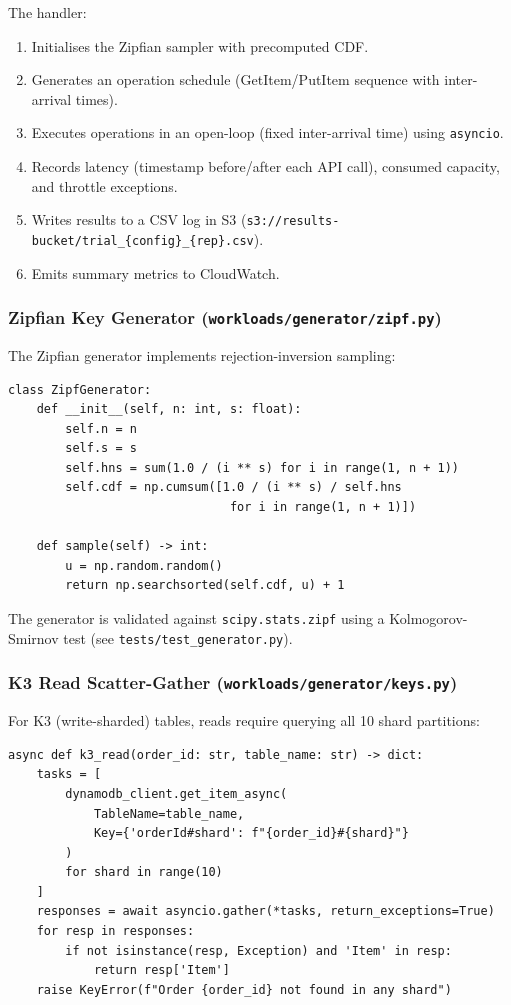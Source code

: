 The handler:

\begin{enumerate}
    \item Initialises the Zipfian sampler with precomputed CDF.
    \item Generates an operation schedule (GetItem/PutItem sequence with inter-arrival times).
    \item Executes operations in an open-loop (fixed inter-arrival time) using \texttt{asyncio}.
    \item Records latency (timestamp before/after each API call), consumed capacity, and throttle exceptions.
    \item Writes results to a CSV log in S3 (\texttt{s3://results-bucket/trial\_\{config\}\_\{rep\}.csv}).
    \item Emits summary metrics to CloudWatch.
\end{enumerate}

\subsubsection{Zipfian Key Generator (\texttt{workloads/generator/zipf.py})}

The Zipfian generator implements rejection-inversion sampling:

\begin{verbatim}
class ZipfGenerator:
    def __init__(self, n: int, s: float):
        self.n = n
        self.s = s
        self.hns = sum(1.0 / (i ** s) for i in range(1, n + 1))
        self.cdf = np.cumsum([1.0 / (i ** s) / self.hns 
                               for i in range(1, n + 1)])
    
    def sample(self) -> int:
        u = np.random.random()
        return np.searchsorted(self.cdf, u) + 1
\end{verbatim}

The generator is validated against \texttt{scipy.stats.zipf} using a Kolmogorov-Smirnov test (see \texttt{tests/test\_generator.py}).

\subsubsection{K3 Read Scatter-Gather (\texttt{workloads/generator/keys.py})}

For K3 (write-sharded) tables, reads require querying all 10 shard partitions:

\begin{verbatim}
async def k3_read(order_id: str, table_name: str) -> dict:
    tasks = [
        dynamodb_client.get_item_async(
            TableName=table_name,
            Key={'orderId#shard': f"{order_id}#{shard}"}
        )
        for shard in range(10)
    ]
    responses = await asyncio.gather(*tasks, return_exceptions=True)
    for resp in responses:
        if not isinstance(resp, Exception) and 'Item' in resp:
            return resp['Item']
    raise KeyError(f"Order {order_id} not found in any shard")
\end{verbatim}

